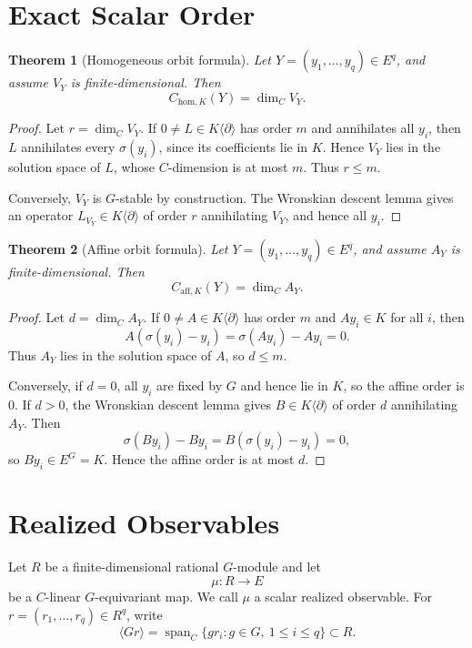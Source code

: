 \documentclass[11pt]{article}
\newtheorem{theorem}{Theorem}[section]
\DeclareMathOperator{\Span}{span}
\begin{document}
\section{Exact Scalar Order}

\begin{theorem}[Homogeneous orbit formula]
Let \(Y=(y_1,\ldots,y_q)\in E^q\), and assume \(V_Y\) is finite-dimensional. Then
\[
C_{\mathrm{hom},K}(Y)=\dim_C V_Y.
\]
\end{theorem}

\begin{proof}
Let \(r=\dim_C V_Y\). If \(0\ne L\in K\langle\partial\rangle\) has order \(m\) and annihilates all \(y_i\), then \(L\) annihilates every \(\sigma(y_i)\), since its coefficients lie in \(K\). Hence \(V_Y\) lies in the solution space of \(L\), whose \(C\)-dimension is at most \(m\). Thus \(r\le m\).

Conversely, \(V_Y\) is \(G\)-stable by construction. The Wronskian descent lemma gives an operator \(L_{V_Y}\in K\langle\partial\rangle\) of order \(r\) annihilating \(V_Y\), and hence all \(y_i\).
\end{proof}

\begin{theorem}[Affine orbit formula]
Let \(Y=(y_1,\ldots,y_q)\in E^q\), and assume \(A_Y\) is finite-dimensional. Then
\[
C_{\mathrm{aff},K}(Y)=\dim_C A_Y.
\]
\end{theorem}

\begin{proof}
Let \(d=\dim_C A_Y\). If \(0\ne A\in K\langle\partial\rangle\) has order \(m\) and \(Ay_i\in K\) for all \(i\), then
\[
A(\sigma(y_i)-y_i)=\sigma(Ay_i)-Ay_i=0.
\]
Thus \(A_Y\) lies in the solution space of \(A\), so \(d\le m\).

Conversely, if \(d=0\), all \(y_i\) are fixed by \(G\) and hence lie in \(K\), so the affine order is \(0\). If \(d>0\), the Wronskian descent lemma gives \(B\in K\langle\partial\rangle\) of order \(d\) annihilating \(A_Y\). Then
\[
\sigma(By_i)-By_i=B(\sigma(y_i)-y_i)=0,
\]
so \(By_i\in E^G=K\). Hence the affine order is at most \(d\).
\end{proof}

\section{Realized Observables}

Let \(R\) be a finite-dimensional rational \(G\)-module and let
\[
\mu:R\to E
\]
be a \(C\)-linear \(G\)-equivariant map. We call \(\mu\) a scalar realized observable. For \(r=(r_1,\ldots,r_q)\in R^q\), write
\[
\langle G r\rangle=
\Span_C\{g r_i:g\in G,\ 1\le i\le q\}\subset R.
\]
\end{document}
